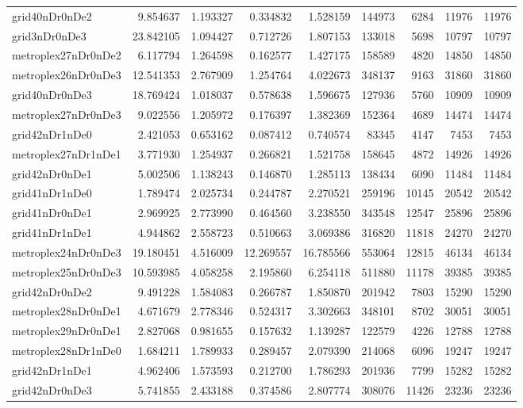 \begin{longtable}{|l|r|r|r|r|r|r|r|r|}
grid40nDr0nDe2 & 9.854637 & 1.193327 & 0.334832 & 1.528159 & 144973 & 6284 & 11976 & 11976 \\
grid3nDr0nDe3 & 23.842105 & 1.094427 & 0.712726 & 1.807153 & 133018 & 5698 & 10797 & 10797 \\
metroplex27nDr0nDe2 & 6.117794 & 1.264598 & 0.162577 & 1.427175 & 158589 & 4820 & 14850 & 14850 \\
metroplex26nDr0nDe3 & 12.541353 & 2.767909 & 1.254764 & 4.022673 & 348137 & 9163 & 31860 & 31860 \\
grid40nDr0nDe3 & 18.769424 & 1.018037 & 0.578638 & 1.596675 & 127936 & 5760 & 10909 & 10909 \\
metroplex27nDr0nDe3 & 9.022556 & 1.205972 & 0.176397 & 1.382369 & 152364 & 4689 & 14474 & 14474 \\
grid42nDr1nDe0 & 2.421053 & 0.653162 & 0.087412 & 0.740574 & 83345 & 4147 & 7453 & 7453 \\
metroplex27nDr1nDe1 & 3.771930 & 1.254937 & 0.266821 & 1.521758 & 158645 & 4872 & 14926 & 14926 \\
grid42nDr0nDe1 & 5.002506 & 1.138243 & 0.146870 & 1.285113 & 138434 & 6090 & 11484 & 11484 \\
grid41nDr1nDe0 & 1.789474 & 2.025734 & 0.244787 & 2.270521 & 259196 & 10145 & 20542 & 20542 \\
grid41nDr0nDe1 & 2.969925 & 2.773990 & 0.464560 & 3.238550 & 343548 & 12547 & 25896 & 25896 \\
grid41nDr1nDe1 & 4.944862 & 2.558723 & 0.510663 & 3.069386 & 316820 & 11818 & 24270 & 24270 \\
metroplex24nDr0nDe3 & 19.180451 & 4.516009 & 12.269557 & 16.785566 & 553064 & 12815 & 46134 & 46134 \\
metroplex25nDr0nDe3 & 10.593985 & 4.058258 & 2.195860 & 6.254118 & 511880 & 11178 & 39385 & 39385 \\
grid42nDr0nDe2 & 9.491228 & 1.584083 & 0.266787 & 1.850870 & 201942 & 7803 & 15290 & 15290 \\
metroplex28nDr0nDe1 & 4.671679 & 2.778346 & 0.524317 & 3.302663 & 348101 & 8702 & 30051 & 30051 \\
metroplex29nDr0nDe1 & 2.827068 & 0.981655 & 0.157632 & 1.139287 & 122579 & 4226 & 12788 & 12788 \\
metroplex28nDr1nDe0 & 1.684211 & 1.789933 & 0.289457 & 2.079390 & 214068 & 6096 & 19247 & 19247 \\
grid42nDr1nDe1 & 4.962406 & 1.573593 & 0.212700 & 1.786293 & 201936 & 7799 & 15282 & 15282 \\
grid42nDr0nDe3 & 5.741855 & 2.433188 & 0.374586 & 2.807774 & 308076 & 11426 & 23236 & 23236 \\

\end{longtable}
